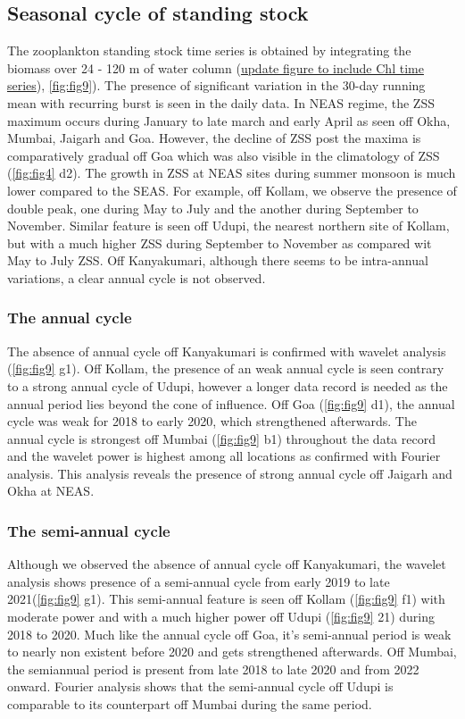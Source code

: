 \documentclass{article}
\begin{document}
	\subsection{Seasonal cycle of standing stock}
	\label{sec:seasonalcyclezss}
	The zooplankton standing stock time series is obtained by integrating the biomass over 24 - 120 m of water column (\underline{update figure to include Chl time series}), \cref{fig:fig9}). The presence of significant variation in the 30-day running mean with recurring burst is seen in the daily data. 
	In NEAS regime, the ZSS maximum occurs during January to late march and early April as seen off Okha, Mumbai, Jaigarh and Goa. However, the decline of ZSS post the maxima is comparatively gradual off Goa which was also visible in the climatology of ZSS (\cref{fig:fig4} d2). The growth in ZSS at NEAS sites during summer monsoon is much lower compared to the SEAS. For example, off Kollam, we observe the presence of double peak, one during May to July and the another during September to November. Similar feature is seen off Udupi, the nearest northern site of Kollam, but with a much higher ZSS during September to November as compared wit May to July ZSS. Off Kanyakumari, although there seems to be intra-annual variations, a clear annual cycle is not observed.
	\subsubsection{The annual cycle}
	The absence of annual cycle off Kanyakumari is confirmed with wavelet analysis (\cref{fig:fig9} g1). Off Kollam, the presence of an weak annual cycle is seen contrary to a strong annual cycle of Udupi, however a longer data record is needed as the annual period lies beyond the cone of influence. Off Goa (\cref{fig:fig9} d1), the annual cycle was weak for 2018 to early 2020, which strengthened afterwards. The annual cycle is strongest off Mumbai (\cref{fig:fig9} b1) throughout the data record and the wavelet power is highest among all locations as confirmed with Fourier analysis. This analysis reveals the presence of strong annual cycle off Jaigarh and 
	Okha at NEAS. 
	\subsubsection{The semi-annual cycle}
	Although we observed the absence of annual cycle off Kanyakumari, the wavelet analysis shows presence of a semi-annual cycle from early 2019 to late 2021(\cref{fig:fig9} g1). This semi-annual feature is seen off Kollam (\cref{fig:fig9} f1) with moderate power and with a much higher power off Udupi (\cref{fig:fig9} 21) during 2018 to 2020. Much like the annual cycle off Goa, it's semi-annual period is weak to nearly non existent before 2020 and gets strengthened afterwards. Off Mumbai, the semiannual period is present from late 2018 to late 2020 and from 2022 onward. Fourier analysis shows that the semi-annual cycle off Udupi is comparable to its counterpart off Mumbai during the same period. 
	
\end{document}
